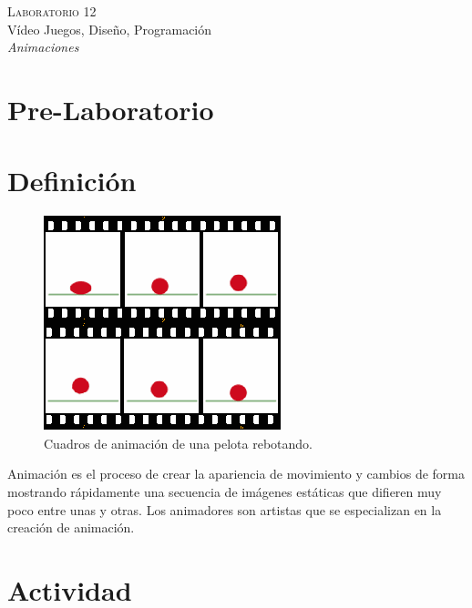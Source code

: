 \begin{center}
\textsc{\Large Laboratorio 12}~\\
{\large Vídeo Juegos, Diseño, Programación}~\\
\emph{Animaciones}
\end{center}

\section{Pre-Laboratorio}

\section{Definición}
\setlength\intextsep{0pt}
\begin{figure}
\includegraphics[width=\linewidth]{semana12/anim_frames.png}
\caption{Cuadros de animación de una pelota rebotando.}
\label{fig:particles}
\end{figure}
Animación es el proceso de crear la apariencia de movimiento y cambios de forma mostrando rápidamente una secuencia de imágenes estáticas que difieren muy poco entre unas y otras. Los animadores son artistas que se especializan en la creación de animación.~\\

\section{Actividad}
